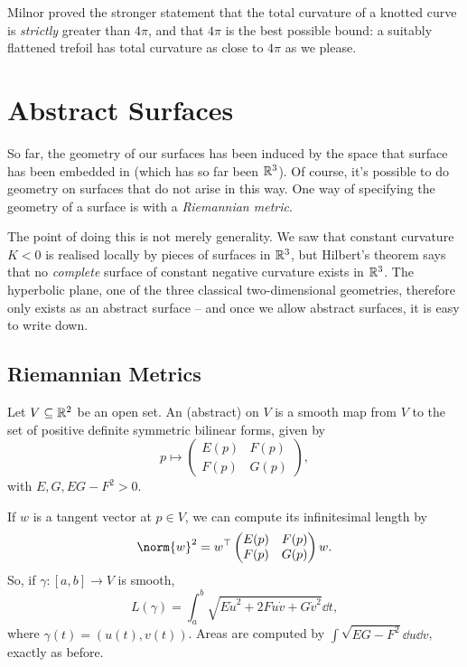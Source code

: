 \documentclass[a4paper]{scrartcl}
\begin{document}
\begin{remark}
    Milnor proved the stronger statement that the total curvature of a knotted curve is \emph{strictly} greater than $4\pi$, and that $4\pi$ is the best possible bound: a suitably flattened trefoil has total curvature as close to $4\pi$ as we please.
\end{remark}

\section{Abstract Surfaces}

So far, the geometry of our surfaces has been induced by the space that surface has been embedded in (which has so far been $\mathbb{R}^3$). Of course, it's possible to do geometry on surfaces that do not arise in this way. One way of specifying the geometry of a surface is with a \emph{Riemannian metric}.

The point of doing this is not merely generality. We saw that constant curvature $K < 0$ is realised locally by pieces of surfaces in $\mathbb{R}^3$, but Hilbert's theorem says that no \emph{complete} surface of constant negative curvature exists in $\mathbb{R}^3$. The hyperbolic plane, one of the three classical two-dimensional geometries, therefore only exists as an abstract surface -- and once we allow abstract surfaces, it is easy to write down.

\subsection{Riemannian Metrics}

\begin{definition}
    Let $V \subseteq \mathbb{R}^2$ be an open set. An (abstract)  on $V$ is a smooth map from $V$ to the set of positive definite symmetric bilinear forms, given by
    $$
    p \mapsto \begin{pmatrix}
        E(p) & F(p) \\
        F(p) & G(p)
    \end{pmatrix},
    $$
    with $E, G, EG - F^2 > 0$.
\end{definition}

If $w$ is a tangent vector at $p \in V$, we can compute its infinitesimal length by
$$
\norm{w}^2 = w^\top \begin{pmatrix}
    E(p) & F(p) \\ F(p) & G(p)
\end{pmatrix} w.
$$
So, if $\gamma: [a, b] \rightarrow V$ is smooth,
$$
L(\gamma) = \int_a^b \sqrt{E \dot{u}^2 + 2F \dot{u}\dot{v} + G \dot{v}^2} \dd t,
$$
where $\gamma(t) = (u(t), v(t))$. Areas are computed by $\int\sqrt{EG-F^2}\dd u \dd v$, exactly as before.
\end{document}
